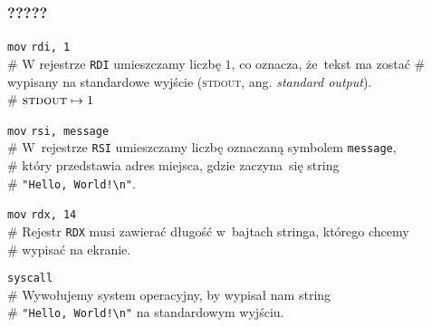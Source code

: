 \documentclass[10pt,t]{beamer}
\begin{document}
\begin{frame}
  \frametitle{?????}


  \hphantom{aaaaaaaaa} \texttt{mov} \hphantom{aaaaaa} \texttt{rdi, 1} \\
  \# W rejestrze \texttt{RDI} umieszczamy liczbę $1$, co oznacza, że~tekst
  ma zostać
  \# wypisany na standardowe wyjście (\textsc{stdout}, ang.
  \textit{standard output}). \\
  \# $\text{\textsc{stdout}} \mapsto 1$

  \hphantom{aaaaaaaaa} \texttt{mov} \hphantom{aaaaaa}
  \texttt{rsi, message} \\
  \# W~rejestrze \texttt{RSI} umieszczamy liczbę oznaczaną
  symbolem \texttt{message}, \\
  \# który przedstawia adres miejsca, gdzie zaczyna~się string \\
  \# \texttt{"Hello, World!\textbackslash n"}.

  \hphantom{aaaaaaaaa} \texttt{mov} \hphantom{aaaaaa} \texttt{rdx, 14} \\
  \# Rejestr \texttt{RDX} musi zawierać długość w~bajtach stringa, którego
  chcemy \\
  \# wypisać na ekranie.

  \hphantom{aaaaaaaaa} \texttt{syscall} \\
  \# Wywołujemy system operacyjny, by wypisał nam string \\
  \# \texttt{"Hello, World!\textbackslash n"} na standardowym
  wyjściu.

\end{frame}
\end{document}
